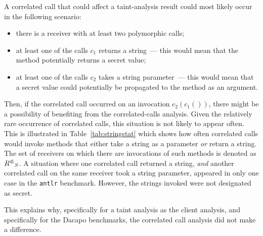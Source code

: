 A correlated call that could affect a taint-analysis result could most likely occur in the following scenario:
\begin{itemize}
  \item there is a receiver with at least two polymorphic calls;
  \item at least one of the calls $c_1$ returns a string~--- this would mean that the method potentially returns a secret value;
  \item at least one of the calls $c_2$ takes a string parameter~--- this would mean that a secret value could potentially be propagated to the method as an argument.
\end{itemize}
Then, if the correlated call occurred on an invocation $c_2(c_1())$, there might be a possibility of benefiting from the correlated-calls analysis. 
Given the relatively rare occurrence of correlated calls, this situation is not likely to appear often. 
This is illustrated in Table~\ref{tab:stringstat} which shows how often correlated calls would invoke methods that either take a string as a parameter \textit{or} return a string.
The set of receivers on which there are invocations of such methods is denoted as ${R^\Subset}_S$. 
A situation where one correlated call returned a string, \textit{and} another correlated call on the same receiver took a string parameter, appeared in only one case in the \verb'antlr' benchmark. However, the strings invoked were not designated as secret.

This explains why, specifically for a taint analysis as the client analysis, and specifically for the Dacapo benchmarks, the correlated call analysis did not make a difference.

